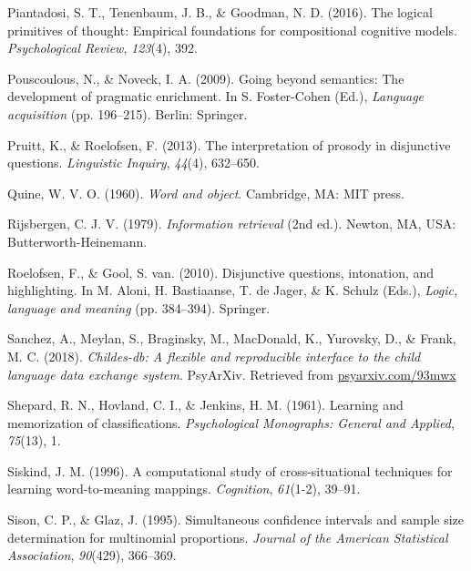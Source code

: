 \documentclass[
  ,man,floatsintext]{apa6}
\newlength{\cslhangindent}
\newlength{\cslentryspacingunit} %
\newenvironment{CSLReferences}[2] %
 {%
  \setlength{\parindent}{0pt}
  \ifodd #1
  \let\oldpar\par
  \def\par{\hangindent=\cslhangindent\oldpar}
  \fi
  \setlength{\parskip}{#2\cslentryspacingunit}
 }%
 {}
\begin{document}
\begin{CSLReferences}{1}{0}
\leavevmode{}%
Piantadosi, S. T., Tenenbaum, J. B., \& Goodman, N. D. (2016). The logical primitives of thought: Empirical foundations for compositional cognitive models. \emph{Psychological Review}, \emph{123}(4), 392.

\leavevmode{}%
Pouscoulous, N., \& Noveck, I. A. (2009). Going beyond semantics: The development of pragmatic enrichment. In S. Foster-Cohen (Ed.), \emph{Language acquisition} (pp. 196--215). Berlin: Springer.

\leavevmode{}%
Pruitt, K., \& Roelofsen, F. (2013). The interpretation of prosody in disjunctive questions. \emph{Linguistic Inquiry}, \emph{44}(4), 632--650.

\leavevmode{}%
Quine, W. V. O. (1960). \emph{Word and object}. Cambridge, MA: MIT press.

\leavevmode{}%
Rijsbergen, C. J. V. (1979). \emph{Information retrieval} (2nd ed.). Newton, MA, USA: Butterworth-Heinemann.

\leavevmode{}%
Roelofsen, F., \& Gool, S. van. (2010). Disjunctive questions, intonation, and highlighting. In M. Aloni, H. Bastiaanse, T. de Jager, \& K. Schulz (Eds.), \emph{Logic, language and meaning} (pp. 384--394). Springer.

\leavevmode{}%
Sanchez, A., Meylan, S., Braginsky, M., MacDonald, K., Yurovsky, D., \& Frank, M. C. (2018). \emph{Childes-db: A flexible and reproducible interface to the child language data exchange system}. PsyArXiv. Retrieved from \href{https://psyarxiv.com/93mwx}{psyarxiv.com/93mwx}

\leavevmode{}%
Shepard, R. N., Hovland, C. I., \& Jenkins, H. M. (1961). Learning and memorization of classifications. \emph{Psychological Monographs: General and Applied}, \emph{75}(13), 1.

\leavevmode{}%
Siskind, J. M. (1996). A computational study of cross-situational techniques for learning word-to-meaning mappings. \emph{Cognition}, \emph{61}(1-2), 39--91.

\leavevmode{}%
Sison, C. P., \& Glaz, J. (1995). Simultaneous confidence intervals and sample size determination for multinomial proportions. \emph{Journal of the American Statistical Association}, \emph{90}(429), 366--369.


\end{CSLReferences}
\end{document}
